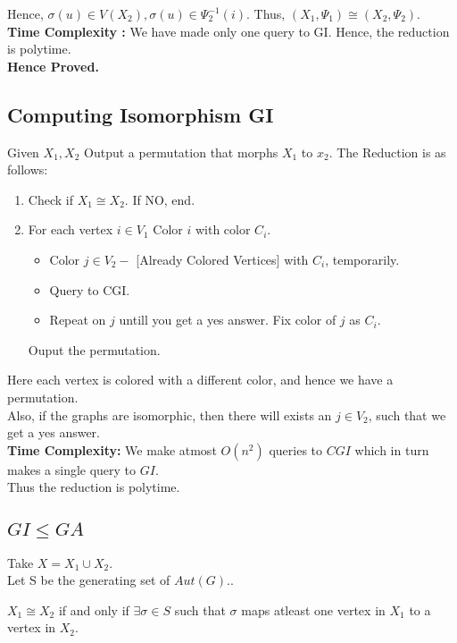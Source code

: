 Hence, $\sigma(u) \in V(X_2) , \sigma(u) \in \Psi_2^{-1}(i)$. Thus, $(X_1,\Psi_1) \cong (X_2,\Psi_2)$.\\

\textbf{Time Complexity :} We have made only one query to GI. Hence, the reduction is polytime.\\

\textbf{Hence Proved.}

\subsection{Computing Isomorphism \le GI}
Given $X_1,X_2$ Output a permutation that morphs $X_1$ to $x_2$.
The Reduction is as follows:
\begin{enumerate}
\item Check if $X_1 \cong X_2$. If NO, end.
\item For each vertex $i \in V_1$ 
	Color $i$ with color $C_i$.
	\begin{itemize}
	\item Color $j \in V_2 -$ [Already Colored Vertices] with $C_i$, temporarily.
	\item Query to CGI.
	\item Repeat on $j$ untill you get a yes answer. Fix color of $j$ as $C_i$.
	\end{itemize}
Ouput the permutation.
\end{enumerate}
Here each vertex is colored with a different color, and hence we have a permutation.\\
Also, if the graphs are isomorphic, then there will exists an $j \in V_2$, such that we get a yes answer.\\

\textbf{Time Complexity:} We make atmost $O(n^2)$ queries to $CGI$ which in turn makes a single query to $GI$.\\Thus the reduction is polytime.




\subsection{$GI \le GA$}
Take $X = X_1 \cup X_2$.\\
Let S be the generating set of $Aut(G)$..\\
\begin{claim}
$X_1 \cong X_2$ if and only if $\exists \sigma \in S$ such that $\sigma$ maps atleast one vertex in $X_1$ to a vertex in $X_2$.
\end{claim}

